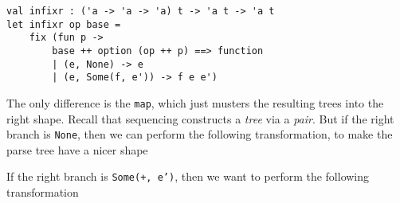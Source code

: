 \begin{verbatim}
val infixr : ('a -> 'a -> 'a) t -> 'a t -> 'a t
let infixr op base =
    fix (fun p ->
        base ++ option (op ++ p) ==> function
        | (e, None) -> e
        | (e, Some(f, e')) -> f e e')
\end{verbatim}
The only difference is the \texttt{map}, which just musters the resulting trees into the right shape. Recall that sequencing constructs a \textit{tree} via a \textit{pair}. But if the right branch is \texttt{None}, then we can perform the following transformation, to make the parse tree have a nicer shape
\begin{center}
\end{center}
    
If the right branch is \texttt{Some(+, e')}, then we want to perform the following transformation

\begin{center}
\end{center}


